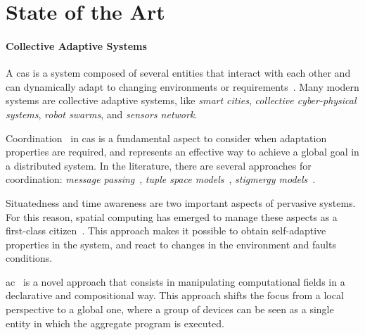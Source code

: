 \documentclass[12pt,a4paper]{article}
\begin{document}
\section{State of the Art}\label{sec:state-of-the-art}

\paragraph{Collective Adaptive Systems}
A \ac{cas} is a system composed of several entities that interact with each other and can dynamically adapt to changing environments or requirements~\cite{DBLP:conf/birthday/HolzlW11}.
%
Many modern systems are collective adaptive systems,
like \emph{smart cities}, \emph{collective cyber-physical systems}, \emph{robot swarms}, and \emph{sensors network}.

Coordination~\cite{DBLP:journals/csur/Ciancarini96} in \ac{cas} is a fundamental aspect to consider when adaptation properties are required,
and represents an effective way to achieve a global goal in a distributed system.
%
In the literature,
there are several approaches for coordination:
\emph{message passing}~\cite{DBLP:journals/jacm/HondaYC16}, \emph{tuple space models}~\cite{DBLP:books/sp/omicini01/RossiCD01}, \emph{stigmergy models}~\cite{DBLP:journals/cogsr/Heylighen16}.

Situatedness and time awareness are two important aspects of pervasive systems.
%
For this reason,
spatial computing has emerged to manage these aspects as a first-class citizen~\cite{Beal_Viroli_2015}.
%
This approach makes it possible to obtain self-adaptive properties in the system,
and react to changes in the environment and faults conditions.

\ac{ac}~\cite{DBLP:journals/computer/BealPV15} is a novel approach that consists in manipulating computational fields in a declarative and compositional way.
%
This approach shifts the focus from a local perspective to a global one,
where a group of devices can be seen as a single entity in which the aggregate program is executed.
\end{document}
